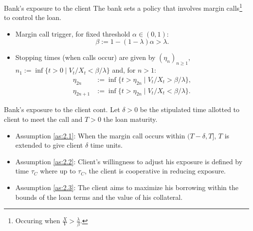 \documentclass[compress, 10pt, notes]{beamer}  %
\begin{document}
\begin{frame}{Bank's exposure to the client}
    The bank sets a policy that involves margin calls\footnote{Occuring when $\frac{X}{V}>\frac{\lambda}{\beta}$.} to control the loan.
    \begin{itemize}
        \item Margin call trigger, for fixed threshold $\alpha \in (0,1)$:
        \begin{equation*}
            \beta := 1-(1-\lambda)\alpha > \lambda.
        \end{equation*}
    \item Stopping times (when calls occur) are given by $(\eta_n)_{n \geq 1}$, $n_1 := \inf\{ t>0 \mid V_t / X_t < \beta / \lambda \}$ and, for $n>1$:
    \begin{align*}
        \eta_{2n} &:= \inf\{t>\eta_{2n}\mid V_t/X_t>\beta/\lambda \}, \\
        \eta_{2n+1} &:= \inf\{t>\eta_{2n}\mid V_t/X_t<\beta/\lambda \}.
    \end{align*}
    \end{itemize}
\end{frame}


\begin{frame}{Bank's exposure to the client cont.}
    Let $\delta > 0$ be the stipulated time allotted to client to meet the call and $T > 0$ the loan maturity.
    \begin{itemize}
        \item Assumption \ref{as:2.1}: When the margin call occurs within $(T-\delta, T]$, $T$ is extended to give client $\delta$ time units.
        \item Assumption \ref{as:2.2}: Client's willingness to adjust his exposure is defined by time $\tau_C$ where up to $\tau_C$, the client is cooperative in reducing exposure.
        \item Assumption \ref{as:2.3}: The client aims to maximize his borrowing within the bounds of the loan terms and the value of his collateral.
    \end{itemize}
\end{frame}
\end{document}
